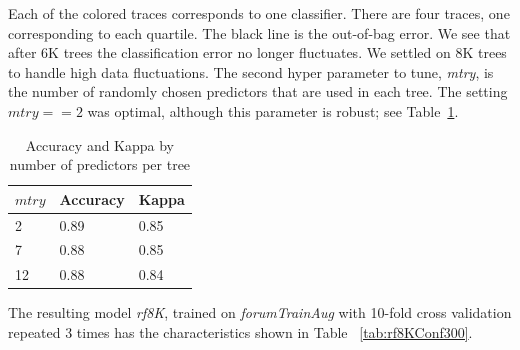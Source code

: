 Each of the colored traces corresponds to one classifier. There are
four traces, one corresponding to each quartile. The black line is the out-of-bag error. We see that after 6K trees
the classification error no longer fluctuates. We settled on 8K trees
to handle high data fluctuations. The second hyper parameter to tune,
\emph{mtry}, is the number of randomly chosen predictors that are used
in each tree. The setting $mtry == 2$ was optimal, although this
parameter is robust; see Table~\ref{tab:mtryFor8K}.

\begin{table}[]
\centering
\caption{Accuracy and Kappa by number of predictors per tree}
\label{tab:mtryFor8K}
\begin{tabular}{@{}lll@{}}
\toprule
$mtry$ & Accuracy & Kappa \\ \midrule
2      & 0.89     & 0.85  \\
7      & 0.88     & 0.85  \\
12     & 0.88     & 0.84  \\ \bottomrule
\end{tabular}
\end{table}


The resulting model \emph{rf8K}, trained on \emph{forumTrainAug} with
10-fold cross validation repeated 3 times has the
characteristics shown in Table ~\ref{tab:rf8KConf300}.


